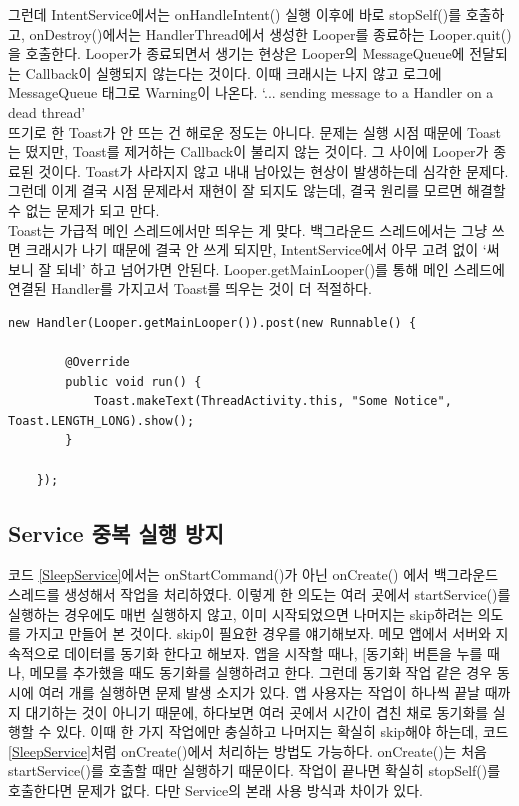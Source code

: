 그런데 IntentService에서는 onHandleIntent() 실행 이후에 바로 stopSelf()를 호출하고, onDestroy()에서는 HandlerThread에서 생성한 Looper를 종료하는 Looper.quit()을 호출한다. Looper가 종료되면서 생기는 현상은 Looper의 MessageQueue에 전달되는 Callback이 실행되지 않는다는 것이다.
이때 크래시는 나지 않고 로그에 MessageQueue 태그로 Warning이 나온다. `... sending message to a Handler on a dead thread'\\

뜨기로 한 Toast가 안 뜨는 건 해로운 정도는 아니다. 문제는 실행 시점 때문에 Toast는 떴지만, Toast를 제거하는 Callback이 불리지 않는 것이다. 그 사이에 Looper가 종료된 것이다.
Toast가 사라지지 않고 내내 남아있는 현상이 발생하는데 심각한 문제다. 
그런데 이게 결국 시점 문제라서 재현이 잘 되지도 않는데, 결국 원리를 모르면 해결할 수 없는 문제가 되고 만다.\\

Toast는 가급적 메인 스레드에서만 띄우는 게 맞다. 
백그라운드 스레드에서는 그냥 쓰면 크래시가 나기 때문에 결국 안 쓰게 되지만, IntentService에서 아무 고려 없이 `써보니 잘 되네' 하고 넘어가면 안된다. Looper.getMainLooper()를 통해 메인 스레드에 연결된 Handler를 가지고서 Toast를 띄우는 것이 더 적절하다.
\begin{lstlisting}[frame=single]
	new Handler(Looper.getMainLooper()).post(new Runnable() {
	
		@Override
		public void run() {
			Toast.makeText(ThreadActivity.this, "Some Notice", Toast.LENGTH_LONG).show();
		}
		
	});
\end{lstlisting}

\subsection{Service 중복 실행 방지}
코드 \ref{SleepService}에서는 onStartCommand()가 아닌 onCreate() 에서 백그라운드 스레드를 생성해서 작업을 처리하였다. 
이렇게 한 의도는 여러 곳에서 startService()를 실행하는 경우에도 매번 실행하지 않고, 이미 시작되었으면 나머지는 skip하려는 의도를 가지고 만들어 본 것이다.
skip이 필요한 경우를 얘기해보자. 
메모 앱에서 서버와 지속적으로 데이터를 동기화 한다고 해보자. 앱을 시작할 때나, [동기화] 버튼을 누를 때나, 메모를 추가했을 때도 동기화를 실행하려고 한다. 
그런데 동기화 작업 같은 경우 동시에 여러 개를 실행하면 문제 발생 소지가 있다. 
앱 사용자는 작업이 하나씩 끝날 때까지 대기하는 것이 아니기 때문에, 하다보면 여러 곳에서 시간이 겹친 채로 동기화를 실행할 수 있다.
이때 한 가지 작업에만 충실하고 나머지는 확실히 skip해야 하는데, 코드 \ref{SleepService}처럼 onCreate()에서 처리하는 방법도 가능하다. 
onCreate()는 처음 startService()를 호출할 때만 실행하기 때문이다. 
작업이 끝나면 확실히 stopSelf()를 호출한다면 문제가 없다. 다만 Service의 본래 사용 방식과 차이가 있다.\\

